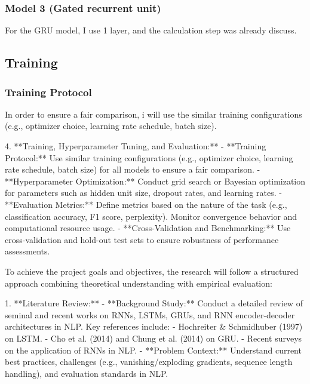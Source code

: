 \documentclass[12pt,a4paper]{article}
\begin{document}
\subsubsection{Model 3 (Gated recurrent unit)}
For the GRU model, I use 1 layer, and the calculation step was already discuss. 

\subsection{Training}
\subsubsection{Training Protocol}
In order to ensure a fair comparison, i will use the similar training configurations (e.g., optimizer choice, learning rate schedule, batch size). 



4. **Training, Hyperparameter Tuning, and Evaluation:**
   - **Training Protocol:**  
     Use similar training configurations (e.g., optimizer choice, learning rate schedule, batch size) for all models to ensure a fair comparison.
   - **Hyperparameter Optimization:**  
     Conduct grid search or Bayesian optimization for parameters such as hidden unit size, dropout rates, and learning rates.
   - **Evaluation Metrics:**  
     Define metrics based on the nature of the task (e.g., classification accuracy, F1 score, perplexity). Monitor convergence behavior and computational resource usage.
   - **Cross-Validation and Benchmarking:**  
     Use cross-validation and hold-out test sets to ensure robustness of performance assessments.



\newpage
To achieve the project goals and objectives, the research will follow a structured approach combining theoretical understanding with empirical evaluation:

1. **Literature Review:**
   - **Background Study:**  
     Conduct a detailed review of seminal and recent works on RNNs, LSTMs, GRUs, and RNN encoder-decoder architectures in NLP. Key references include:
     - Hochreiter \& Schmidhuber (1997) on LSTM.
     - Cho et al. (2014) and Chung et al. (2014) on GRU.
     - Recent surveys on the application of RNNs in NLP.
   - **Problem Context:**  
     Understand current best practices, challenges (e.g., vanishing/exploding gradients, sequence length handling), and evaluation standards in NLP.
\end{document}
